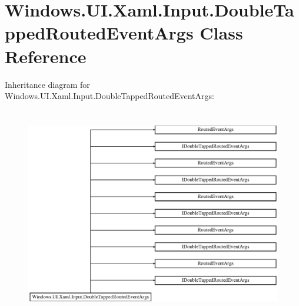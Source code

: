 \hypertarget{class_windows_1_1_u_i_1_1_xaml_1_1_input_1_1_double_tapped_routed_event_args}{}\section{Windows.\+U\+I.\+Xaml.\+Input.\+Double\+Tapped\+Routed\+Event\+Args Class Reference}
\label{class_windows_1_1_u_i_1_1_xaml_1_1_input_1_1_double_tapped_routed_event_args}
Inheritance diagram for Windows.\+U\+I.\+Xaml.\+Input.\+Double\+Tapped\+Routed\+Event\+Args\+:\begin{figure}[H]
\begin{center}
\leavevmode
\includegraphics[height=9.277108cm]{class_windows_1_1_u_i_1_1_xaml_1_1_input_1_1_double_tapped_routed_event_args}
\end{center}
\end{figure}
